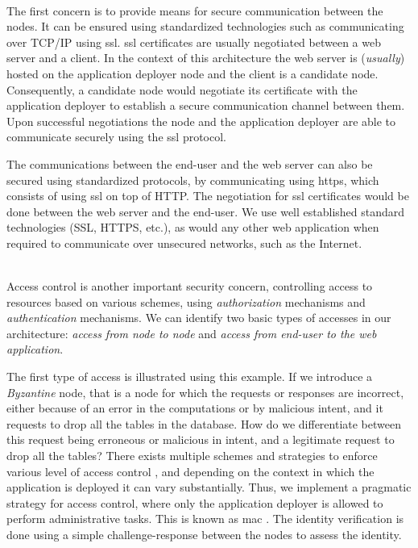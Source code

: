 \documentclass[12pt, titlepage]{uo_temp}
\begin{document}
     \\ The first concern is to provide means for secure communication between the
     nodes. It can be ensured using standardized technologies such as communicating over
     TCP/IP using \gls{ssl}. \gls{ssl} certificates are usually negotiated between a web
     server and a client. In the context of this architecture the web server is
     (\emph{usually}) hosted on the application deployer node and the client is a
     candidate node. Consequently, a candidate node would negotiate its certificate with
     the application deployer to establish a secure communication channel between
     them. Upon successful negotiations the node and the application deployer are able
     to communicate securely using the \gls{ssl} protocol.

     The communications between the end-user and the web server can also be secured using
     standardized protocols, by communicating using \gls{https}, which consists of using
     \gls{ssl} on top of HTTP. The negotiation for \gls{ssl} certificates would be done
     between the web server and the end-user. We use well established standard
     technologies (SSL, HTTPS, etc.), as would any other web application when
     required to communicate over unsecured networks, such as the Internet.

     \\ Access control is another important security concern, controlling access to
     resources based on various schemes, using \emph{authorization} mechanisms and
     \emph{authentication} mechanisms. We can identify two basic types of accesses in our
     architecture: \emph{access from node to node} and \emph{access from end-user to the
       web application}.

     The first type of access is illustrated using this example. If we introduce a
     \emph{Byzantine} node, that is a node for which the requests or responses are
     incorrect, either because of an error in the computations or by malicious intent, and
     it requests to drop all the tables in the database. How do we differentiate between
     this request being erroneous or malicious in intent, and a legitimate request to drop
     all the tables? There exists multiple schemes and strategies to enforce various level
     of access control \cite{dara2014multi} \cite{gollman2010computer}, and depending on
     the context in which the application is deployed it can vary substantially. Thus, we
     implement a pragmatic strategy for access control, where only the application
     deployer is allowed to perform administrative tasks. This is known as \gls{mac}
     \cite{nyanchama1995modeling}. The identity verification is done using a simple
     challenge-response between the nodes to assess the identity.
\end{document}
